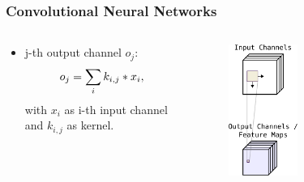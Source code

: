 \begin{frame}
  \frametitle{Convolutional Neural Networks}
  \vspace{-0.75cm}
  \begin{columns}
    \begin{column}{0.5\textwidth}
      \begin{itemize}
        \item j-th output channel $o_j$:
        \begin{equation*}
          \footnotesize
          o_j = \sum_{i} k_{i, j} \ast x_i,
        \end{equation*}
        \footnotesize
        with $x_i$ as i-th input channel and $k_{i, j}$ as kernel.   
      \end{itemize}
    \end{column}
    \begin{column}{0.5\textwidth}
      \centering
      \begin{figure} \includegraphics[width=0.45\textwidth]{./figs/nn_theory_cnn_scheme.pdf} \end{figure}
      \vfill
    \end{column}
  \end{columns}
\end{frame}

